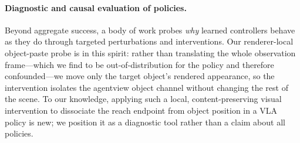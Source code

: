 \paragraph{Diagnostic and causal evaluation of policies.} Beyond aggregate success, a body of work probes \emph{why} learned controllers behave as they do through targeted perturbations and interventions. Our renderer-local object-paste probe is in this spirit: rather than translating the whole observation frame---which we find to be out-of-distribution for the policy and therefore confounded---we move only the target object's rendered appearance, so the intervention isolates the agentview object channel without changing the rest of the scene. To our knowledge, applying such a local, content-preserving visual intervention to dissociate the reach endpoint from object position in a VLA policy is new; we position it as a diagnostic tool rather than a claim about all policies.
